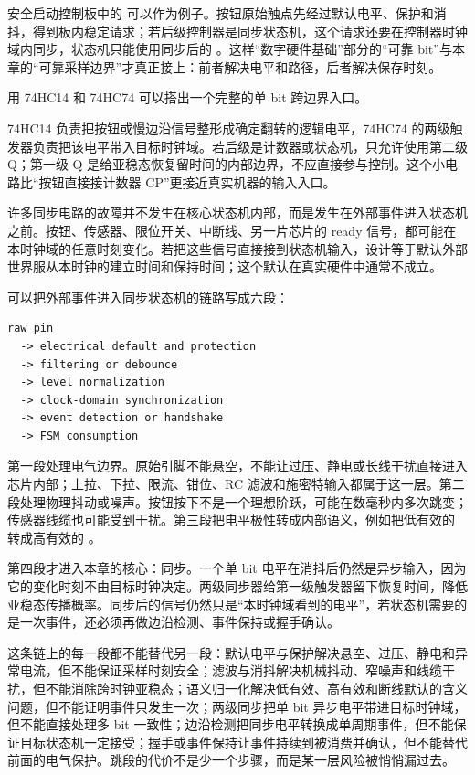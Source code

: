 安全启动控制板中的  可以作为例子。按钮原始触点先经过默认电平、保护和消抖，得到板内稳定请求；若后级控制器是同步状态机，这个请求还要在控制器时钟域内同步，状态机只能使用同步后的 。这样“数字硬件基础”部分的“可靠 bit”与本章的“可靠采样边界”才真正接上：前者解决电平和路径，后者解决保存时刻。

\begin{chipcase}
用 74HC14 和 74HC74 可以搭出一个完整的单 bit 跨边界入口。

74HC14 负责把按钮或慢边沿信号整形成确定翻转的逻辑电平，74HC74 的两级触发器负责把该电平带入目标时钟域。若后级是计数器或状态机，只允许使用第二级 Q；第一级 Q 是给亚稳态恢复留时间的内部边界，不应直接参与控制。这个小电路比“按钮直接接计数器 CP”更接近真实机器的输入入口。
\end{chipcase}


许多同步电路的故障并不发生在核心状态机内部，而是发生在外部事件进入状态机之前。按钮、传感器、限位开关、中断线、另一片芯片的 ready 信号，都可能在本时钟域的任意时刻变化。若把这些信号直接接到状态机输入，设计等于默认外部世界服从本时钟的建立时间和保持时间；这个默认在真实硬件中通常不成立。

可以把外部事件进入同步状态机的链路写成六段：

\begin{lstlisting}
raw pin
  -> electrical default and protection
  -> filtering or debounce
  -> level normalization
  -> clock-domain synchronization
  -> event detection or handshake
  -> FSM consumption
\end{lstlisting}

第一段处理电气边界。原始引脚不能悬空，不能让过压、静电或长线干扰直接进入芯片内部；上拉、下拉、限流、钳位、RC 滤波和施密特输入都属于这一层。第二段处理物理抖动或噪声。按钮按下不是一个理想阶跃，可能在数毫秒内多次跳变；传感器线缆也可能受到干扰。第三段把电平极性转成内部语义，例如把低有效的  转成高有效的 。

第四段才进入本章的核心：同步。一个单 bit 电平在消抖后仍然是异步输入，因为它的变化时刻不由目标时钟决定。两级同步器给第一级触发器留下恢复时间，降低亚稳态传播概率。同步后的信号仍然只是“本时钟域看到的电平”，若状态机需要的是一次事件，还必须再做边沿检测、事件保持或握手确认。

这条链上的每一段都不能替代另一段：默认电平与保护解决悬空、过压、静电和异常电流，但不能保证采样时刻安全；滤波与消抖解决机械抖动、窄噪声和线缆干扰，但不能消除跨时钟亚稳态；语义归一化解决低有效、高有效和断线默认的含义问题，但不能证明事件只发生一次；两级同步把单 bit 异步电平带进目标时钟域，但不能直接处理多 bit 一致性；边沿检测把同步电平转换成单周期事件，但不能保证目标状态机一定接受；握手或事件保持让事件持续到被消费并确认，但不能替代前面的电气保护。跳段的代价不是少一个步骤，而是某一层风险被悄悄漏过去。

